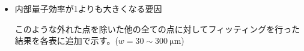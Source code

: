 {\begin{itemize}
プロットの算出方法に問題があったためと考えられる(L=0.20\si{\micro\metre}での緑$L=10\ \si{\micro\metre}$、黄色$L=5\ \si{\micro\metre}$プロットが異常に高い値を示している)。スロープ効率2$\Delta P/\Delta I$算出のためのILカーブフィッティングの際に発振直後をフィットしたため、誘導放出の効果が支配的ではない領域の効率を見積もってしまった。このため、スロープ効率2$\Delta P/\Delta I$および外部量子効率$\eta_{d}$が低く見積もられてしまった。これにしたがって$1/\eta_{d}$が異常に高くなってしまったと考えられる。(付録にILカーブを載せるのが良いか全部？)

測定においては、共振器長が大きい試料では発振閾値電流が大きくなるため十分な発振領域を得るために短共振器と比較して大きな電流が必要となる。測定で用いた駆動系では十分な電流が得られなかったために、「発振は確認できたがスロープ効率を見積もるには不十分」な量の電流までのデータしか得られなかった試料があった。このような不十分なデータに対して発振領域のILカーブ直線フィッティングを行ったために低いスロープ効率が算出されてしまったと考えられる。電流源としてより強力なものを用いるといった対策が必要である。

\item 内部量子効率が1よりも大きくなる要因



このような外れた点を除いた他の全ての点に対してフィッティングを行った結果を各表に追加で示す。($w=30\sim300\ \si{\micro\metre}$)
\end{itemize}

}
